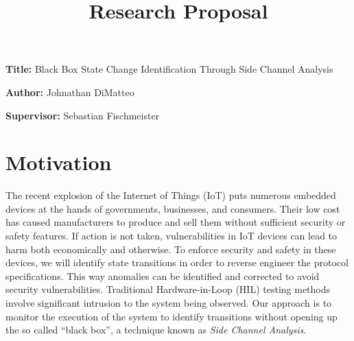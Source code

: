 \documentclass[11pt, a4paper]{article}
\title{Research Proposal}
\author{}
\date{}
\newcommand{\namelistlabel}[1]{\mbox{#1}\hfil}
\newenvironment{namelist}[1]{%
\begin{list}{}
    {
        \let\makelabel\namelistlabel
        \settowidth{\labelwidth}{#1}
        \setlength{\leftmargin}{1.1\labelwidth}
    }
  }{%
\end{list}}
\begin{document}
\maketitle

\begin{namelist}{xxxxxxxxxxxx}
\item[{\bf Title:}]
	Black Box State Change Identification Through Side Channel Analysis
\item[{\bf Author:}]
	Johnathan DiMatteo
\item[{\bf Supervisor:}]
	Sebastian Fischmeister
\end{namelist}

\section*{Motivation} 


The recent explosion of the Internet of Things (IoT) puts numerous embedded devices at the hands of governments, businesses, and consumers.
Their low cost has caused manufacturers to produce and sell them without sufficient security or safety features.
If action is not taken, vulnerabilities in IoT devices can lead to harm both economically and otherwise.
To enforce security and safety in these devices, we will identify state transitions in order to reverse engineer the protocol specifications.
This way anomalies can be identified and corrected to avoid security vulnerabilities.
Traditional Hardware-in-Loop (HIL) testing methods involve significant intrusion to the system being observed.
Our approach is to monitor the execution of the system to identify transitions without opening up the so called ``black box'', a technique known as \textit{Side Channel Analysis}. 


\end{document}
